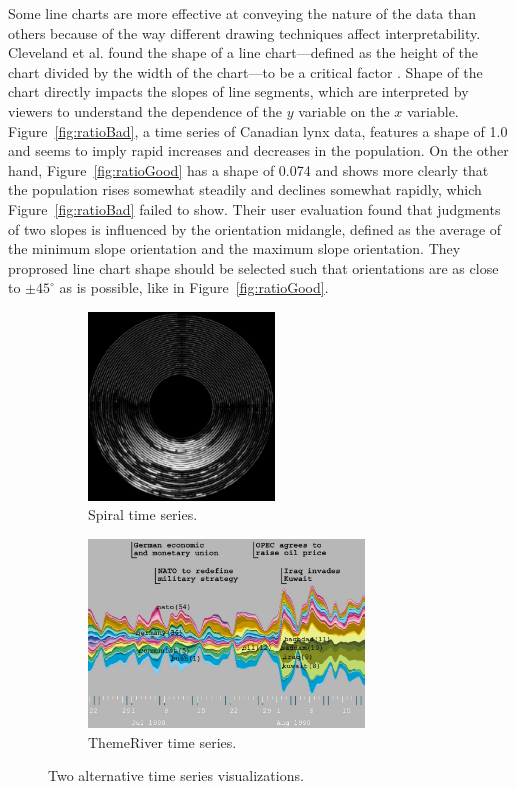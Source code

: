 Some line charts are more effective at conveying the nature of the data than others because of the way different drawing techniques affect interpretability.  Cleveland et al. found the shape of a line chart---defined as the height of the chart divided by the width of the chart---to be a critical factor \cite{cleveland1988}.   Shape of the chart directly impacts the slopes of line segments, which are interpreted by viewers to understand the dependence of the $y$ variable on the $x$ variable.  Figure~\ref{fig:ratioBad}, a time series of Canadian lynx data, features a shape of 1.0 and seems to imply rapid increases and decreases in the population.  On the other hand, Figure~\ref{fig:ratioGood} has a shape of 0.074 and shows more clearly that the population rises somewhat steadily and declines somewhat rapidly, which Figure~\ref{fig:ratioBad} failed to show.  Their user evaluation found that judgments of two slopes is influenced by the orientation midangle, defined as the average of the minimum slope orientation and the maximum slope orientation.  They proprosed line chart shape should be selected such that orientations are as close to $\pm 45 ^{\circ}$ as is possible, like in Figure~\ref{fig:ratioGood}.

\begin{figure}
\centering
	\begin{subfigure}[b]{0.45\textwidth}
		\includegraphics[height=5cm]{figures/eps/spiral.eps}
		\caption{Spiral time series.}
		\label{fig:altSpiral}
	\end{subfigure}	
	\begin{subfigure}[b]{0.45\textwidth}
		\includegraphics[height=5cm]{figures/eps/themeriver.eps}
		\caption{ThemeRiver time series.}
		\label{fig:altThemeriver}
	\end{subfigure}
	\caption{Two alternative time series visualizations.}
	\label{fig:tsAlternatives}
\end{figure}

